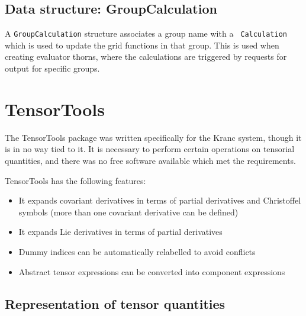 \documentclass{report}
\begin{document}
\subsection{Data structure: GroupCalculation}

A {\tt GroupCalculation} structure associates a group name with a {\tt
Calculation} which is used to update the grid functions in that
group. This is used when creating evaluator thorns, where the
calculations are triggered by requests for output for specific groups.



\section{TensorTools}

The TensorTools package was written specifically for the Kranc system,
though it is in no way tied to it.  It is necessary to perform certain
operations on tensorial quantities, and there was no free software
available which met the requirements.

TensorTools has the following features:
\begin{itemize}
\item{It expands covariant derivatives in terms of partial derivatives
and Christoffel symbols (more than one covariant derivative can be
defined)}
\item{It expands Lie derivatives in terms of partial derivatives}
\item{Dummy indices can be automatically relabelled to avoid
conflicts}
\item{Abstract tensor expressions can be converted into component
expressions}
\end{itemize}

\subsection{Representation of tensor quantities}
\end{document}
